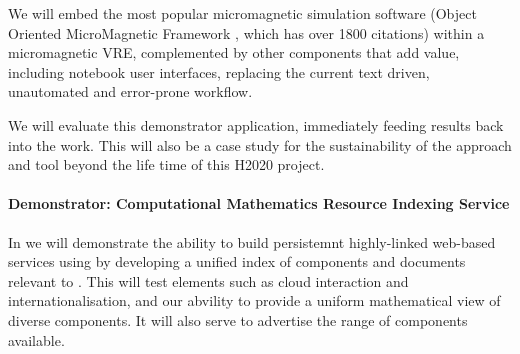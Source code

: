 We will embed the most popular micromagnetic
simulation software (Object Oriented MicroMagnetic Framework
\cite{OOMMF-url}, which has over 1800 citations) within a micromagnetic VRE, complemented by other
components that add value, including notebook user interfaces,
replacing the current text driven, unautomated and error-prone workflow.

We will evaluate this demonstrator application, immediately feeding
results back into the \TheProject work. This will also be a case study
for the sustainability of the approach and tool beyond the life time
of this H2020 project.

\paragraph{Demonstrator: Computational Mathematics Resource Indexing
Service}

In  
we will demonstrate the ability to build persistemnt highly-linked
web-based services using \TheProject by developing a unified index of
components and documents relevant to \TheProject. This will test
elements such as cloud interaction and internationalisation, and our
abvility to provide a uniform mathematical view of diverse
components. It will also serve
to advertise the range of components available.

